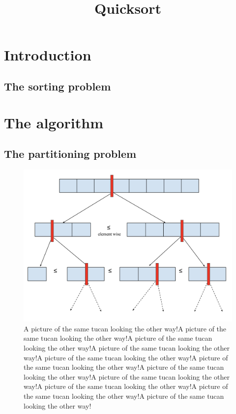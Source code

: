 \documentclass[]{finalproject}
\title{Quicksort}
\subtitle{}
\begin{document}
\maketitle

\section{Introduction} \label{introduction}
\subsection{The sorting problem}

\section{The algorithm}


\subsection{The partitioning problem}

\begin{figure}
  \begin{center}
   \includegraphics[scale=0.25]{img/recursive_partitioning.png}
  \end{center}
  \caption{A picture of the same tucan looking the other way!A picture of the same tucan looking the other way!A picture of the same tucan looking the other way!A picture of the same tucan looking the other way!A picture of the same tucan looking the other way!A picture of the same tucan looking the other way!A picture of the same tucan looking the other way!A picture of the same tucan looking the other way!A picture of the same tucan looking the other way!A picture of the same tucan looking the other way!A picture of the same tucan looking the other way!}
\end{figure}
\end{document}
